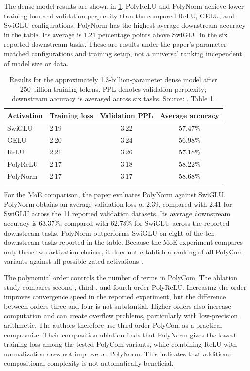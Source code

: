 The dense-model results are shown in \cref{tab:act-polycom-dense}.
PolyReLU and PolyNorm achieve lower training loss and validation
perplexity than the compared ReLU, GELU, and SwiGLU configurations.
PolyNorm has the highest average downstream accuracy in the table.
Its average is 1.21 percentage points above SwiGLU in the six
reported downstream tasks. These are results under the paper's
parameter-matched configurations and training setup, not a universal
ranking independent of model size or data.

\begin{table}[htbp]
    \centering
    \caption{Results for the approximately 1.3-billion-parameter dense
    model after 250 billion training tokens. PPL denotes validation
    perplexity; downstream accuracy is averaged across six tasks.
    Source: \textcite{zhuo2025polycom}, Table 1.}
    \label{tab:act-polycom-dense}
    \small
    \begin{tabularx}{\textwidth}{l X c c}
        \toprule
        Activation & Training loss & Validation PPL & Average accuracy \\
        \midrule
        SwiGLU   & 2.19 & 3.22 & 57.47\% \\
        GELU     & 2.20 & 3.24 & 56.98\% \\
        ReLU     & 2.21 & 3.26 & 57.18\% \\
        PolyReLU & 2.17 & 3.18 & 58.22\% \\
        PolyNorm & 2.17 & 3.17 & 58.68\% \\
        \bottomrule
    \end{tabularx}
    \normalsize
\end{table}

For the MoE comparison, the paper evaluates PolyNorm against
SwiGLU. PolyNorm obtains an average validation loss of 2.39,
compared with 2.41 for SwiGLU across the 11 reported validation
datasets. Its average downstream accuracy is 63.37\%, compared
with 62.78\% for SwiGLU across the reported downstream tasks.
PolyNorm outperforms SwiGLU on eight of the ten downstream tasks
reported in the table. Because the MoE experiment compares only
these two activation choices, it does not establish a ranking of
all PolyCom variants against all possible gated activations
\parencite{zhuo2025polycom}.

The polynomial order controls the number of terms in PolyCom.
The ablation study compares second-, third-, and fourth-order
PolyReLU. Increasing the order improves convergence speed in the
reported experiment, but the difference between orders three and
four is not substantial. Higher orders also increase computation
and can create overflow problems, particularly with low-precision
arithmetic. The authors therefore use third-order PolyCom as a
practical compromise. Their composition ablation finds that
PolyNorm gives the lowest training loss among the tested
PolyCom variants, while combining ReLU with normalization does
not improve on PolyNorm. This indicates that additional
compositional complexity is not automatically beneficial.

